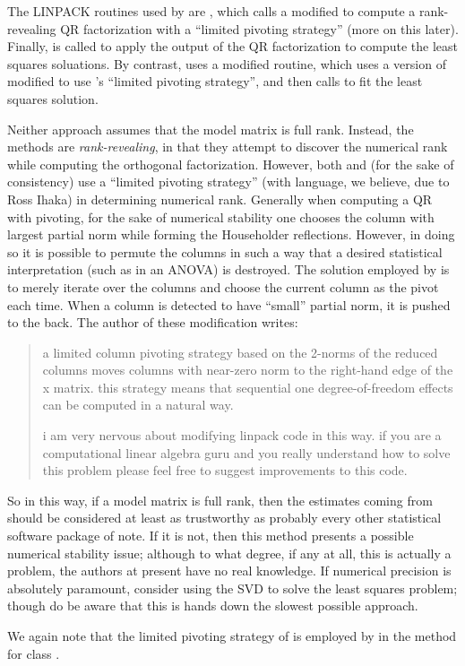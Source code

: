The LINPACK routines used by  are , which calls a modified  to compute a rank-revealing
QR factorization
with a ``limited pivoting strategy'' (more on this later).  Finally,  is called to apply the output of the QR factorization to compute the least squares soluations.  By contrast,
 uses a modified  routine, which uses a version of  modified to use 's ``limited pivoting strategy'', and then calls  to fit the least squares solution.

Neither approach assumes that the model matrix is full rank.  Instead, the methods are \emph{rank-revealing}, in that they attempt to discover the numerical rank while computing the orthogonal factorization.  However, both  and (for the sake of consistency)
 use a ``limited pivoting strategy'' (with language, we believe, due to Ross Ihaka) in determining numerical rank.  Generally when computing a QR with pivoting, for the sake of numerical stability one chooses the column with largest partial norm while forming the Householder reflections.  However, in doing so it is possible to permute the columns in such a way that a desired statistical interpretation (such as in an ANOVA) is destroyed.  The solution employed by  is to merely iterate over the columns and choose the current column as the pivot each time.  When a column is detected to have ``small'' partial norm, it is pushed to the back.  The author of these modification writes:
\begin{quote}
     a limited column pivoting strategy based on the 2-norms 
     of the reduced columns moves columns with near-zero norm to the 
     right-hand edge of the x matrix.  this strategy means that 
     sequential one degree-of-freedom effects can be computed in a 
     natural way.

     i am very nervous about modifying linpack code in this way.
     if you are a computational linear algebra guru and you really
     understand how to solve this problem please feel free to
     suggest improvements to this code.
\end{quote}
So in this way, if a model matrix is full rank, then the estimates coming from  should be considered at least as trustworthy as probably every other statistical software package of note.  If it is not, then this method presents a possible numerical stability issue; although to what degree, if any at all, this is actually a problem, the authors at present have no real knowledge.  If numerical precision is absolutely paramount, consider using the SVD to solve the least squares problem; though do be aware that this is hands down the slowest possible approach.

We again note that the limited pivoting strategy of  is employed by
 in the  method for
class .
